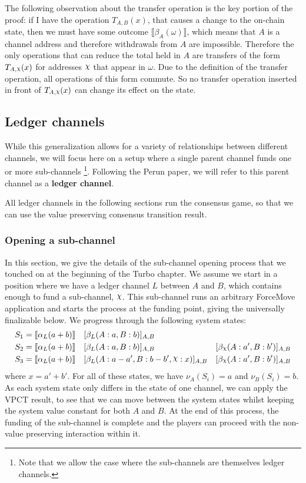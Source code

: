 \documentclass{article}
\DeclareRobustCommand{\rchi}{{\mathpalette\irchi\relax}}
\newcommand{\irchi}[2]{\raisebox{\depth}{$#1\chi$}} %
\theoremstyle{definition}
\newcommand{\adj}[1]{\llbracket #1 \rrbracket}
\newcommand{\enf}[1]{[#1]}
\begin{document}
The following observation about the transfer operation is the key portion of the proof:
if I have the operation $T_{A, B}(x)$, that causes a change to the on-chain state,
then we must have some outcome $\adj{\beta_A(\omega)}$, which means that $A$ is a channel address and therefore withdrawals from $A$ are impossible.
Therefore the only operations that can reduce the total held in $A$ are transfers of the form $T_{A, \rchi}(x)$ for addresses $\rchi$ that appear in $\omega$.
Due to the definition of the transfer operation, all operations of this form commute.
So no transfer operation inserted in front of $T_{A, \rchi}(x)$ can change its effect on the state.

\subsection{Ledger channels}

While this generalization allows for a variety of relationships between different channels,
we will focus here on a setup where a single parent channel funds one or more sub-channels
\footnote{Note that we allow the case where the sub-channels are themselves ledger channels.}.
Following the Perun paper, we will refer to this parent channel as a \textbf{ledger channel}.

All ledger channels in the following sections run the consensus game, so that we can use the value preserving consensus transition result.

\subsubsection{Opening a sub-channel}

In this section, we give the details of the sub-channel opening process that we touched on at the beginning of the Turbo chapter.
We assume we start in a position where we have a ledger channel $L$ between $A$ and $B$, which contains enough to fund a sub-channel, $\rchi$.
This sub-channel runs an arbitrary ForceMove application and starts the process at the funding point, giving the universally finalizable below.
We progress through the following system states:
\begin{align*}
  S_1 &= \adj{\alpha_L(a+b)} &&\enf{\beta_L(A: a, B: b)}_{A, B} & \\
  S_2 &= \adj{\alpha_L(a+b)} &&\enf{\beta_L(A: a, B: b)}_{A, B}&\enf{\beta_\rchi(A: a', B: b')}_{A, B} \\
  S_3 &= \adj{\alpha_L(a+b)} &&\enf{\beta_L(A: a-a', B: b-b', \rchi: x)}_{A, B}&\enf{\beta_\rchi(A: a', B: b')}_{A, B}
\end{align*}
where $x = a' + b'$.
For all of these states, we have $\nu_A(S_i) = a$ and $\nu_B(S_i) = b$.
As each system state only differs in the state of one channel, we can apply the VPCT result, to see that we can move between the system states whilst keeping the system value constant for both $A$ and $B$.
At the end of this process, the funding of the sub-channel is complete and the players can proceed with the non-value preserving interaction within it.
\end{document}
